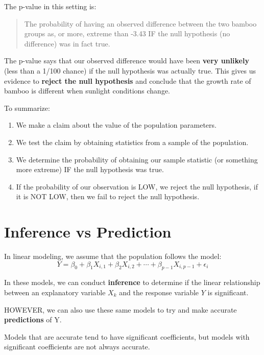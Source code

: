 \documentclass[12pt]{../notes}
\begin{document}
The p-value in this setting is:
\begin{quotation} The probability of having an observed difference between the two bamboo groups as, or more, extreme than -3.43 IF the null hypothesis (no difference) was in fact true. 
\end{quotation}

The p-value says that our observed difference would have been \textbf{very unlikely} (less than a 1/100 chance)  if the null hypothesis was actually true. This gives us evidence to \textbf{reject the null hypothesis} and conclude that the growth rate of bamboo is different when sunlight conditions change.  

\nspace
To summarize:
\begin{enumerate}
\item We make a claim about the value of the population parameters.
\item We test the claim by obtaining statistics from a sample of the population. 
\item We determine the probability of obtaining our sample statistic (or something more extreme) IF the null hypothesis was true. 
\item If the probability of our observation is LOW, we reject the null hypothesis, if it is NOT LOW, then we fail to reject the null hypothesis.  
\end{enumerate}


\begin{minipage}[l][4cm][c]{\textwidth}
\end{minipage}

\newpage
\section{Inference vs Prediction}
In linear modeling, we assume that the population follows the model:
\[Y = \beta_0 + \beta_1X_{i,1} + \beta_2X_{i,2} + \cdots + \beta_{p-1}X_{i, p-1} + \epsilon_i\]

\nspace
In these models, we can conduct \textbf{inference} to determine if the linear relationship between an explanatory variable $X_k$ and the response variable $Y$ is significant. 

\nspace
HOWEVER, we can also use these same models to try and make accurate \textbf{predictions} of Y. 

\nspace
Models that are accurate tend to have significant coefficients, but models with significant coefficients are not always accurate. 





\end{document}
